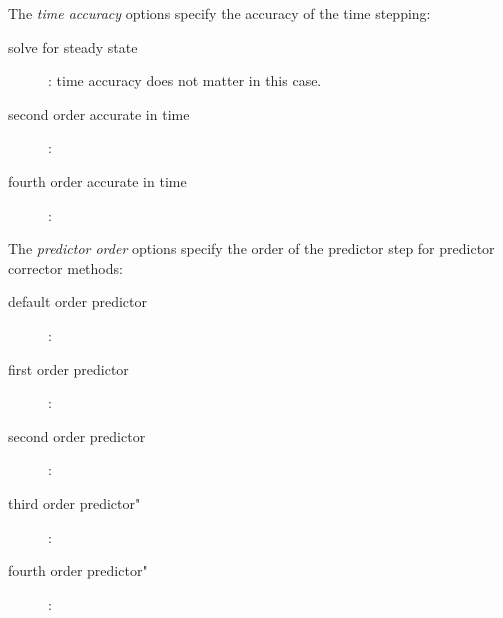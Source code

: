 \documentclass{article}
\begin{document}
\noindent The {\em time accuracy} options specify the accuracy of the time stepping:
\begin{description}
  \item[\qquad solve for steady state] : time accuracy does not matter in this case. 
  \item[\qquad second order accurate in time ] : 
  \item[\qquad fourth order accurate in time ] : 
\end{description}

\noindent The {\em predictor order} options specify the order of the predictor step
for predictor corrector methods: 
\begin{description}
  \item[\qquad default order predictor] :
  \item[\qquad first order predictor] :
  \item[\qquad second order predictor] :
  \item[\qquad third order predictor"] :
  \item[\qquad fourth order predictor"] :
\end{description}

















\end{document}
